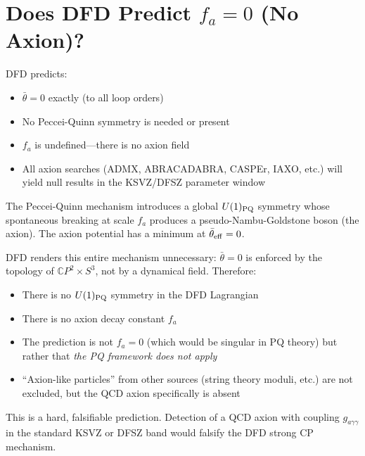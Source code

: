 \documentclass[11pt]{article}
\theoremstyle{remark}
\begin{document}
\section{Does DFD Predict $f_a = 0$ (No Axion)?}

\begin{tcolorbox}[colback=red!5!white, colframe=red!60!black,
  title=Sharp Prediction: No QCD Axion]
DFD predicts:
\begin{itemize}
\item $\bar\theta = 0$ exactly (to all loop orders)
\item No Peccei-Quinn symmetry is needed or present
\item $f_a$ is undefined---there is no axion field
\item All axion searches (ADMX, ABRACADABRA, CASPEr, IAXO, etc.) will yield null results in the KSVZ/DFSZ parameter window
\end{itemize}
\end{tcolorbox}

The Peccei-Quinn mechanism introduces a global $U(1)_{\rm PQ}$ symmetry whose
spontaneous breaking at scale $f_a$ produces a pseudo-Nambu-Goldstone boson
(the axion).  The axion potential has a minimum at $\bar\theta_{\rm eff} = 0$.

DFD renders this entire mechanism unnecessary: $\bar\theta = 0$ is enforced
by the topology of $\mathbb{C}P^2 \times S^3$, not by a dynamical field.
Therefore:
\begin{itemize}
\item There is no $U(1)_{\rm PQ}$ symmetry in the DFD Lagrangian
\item There is no axion decay constant $f_a$
\item The prediction is not $f_a = 0$ (which would be singular in PQ theory)
  but rather that \emph{the PQ framework does not apply}
\item ``Axion-like particles'' from other sources (string theory moduli, etc.)
  are not excluded, but the QCD axion specifically is absent
\end{itemize}

This is a hard, falsifiable prediction.  Detection of a QCD axion with
coupling $g_{a\gamma\gamma}$ in the standard KSVZ or DFSZ band would
falsify the DFD strong CP mechanism.

\end{document}
